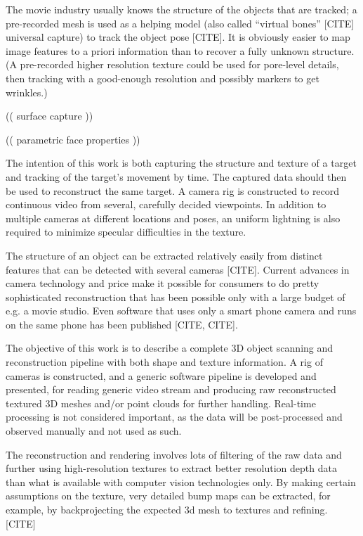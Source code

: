 The movie industry usually knows the structure of the objects that are tracked; a pre-recorded mesh is used as a helping model (also called ``virtual bones'' [CITE] universal capture) to track the object pose [CITE].
It is obviously easier to map image features to a priori information than to recover a fully unknown structure.
(A pre-recorded higher resolution texture could be used for pore-level details, then tracking with a good-enough resolution and possibly markers to get wrinkles.)

(( surface capture ))

(( parametric face properties ))

The intention of this work is both capturing the structure and texture of a target and tracking of the target's movement by time.
The captured data should then be used to reconstruct the same target.
A camera rig is constructed to record continuous video from several, carefully decided viewpoints.
In addition to multiple cameras at different locations and poses, an uniform lightning is also required to minimize specular difficulties in the texture.

The structure of an object can be extracted relatively easily from distinct features that can be detected with several cameras [CITE].
Current advances in camera technology and price make it possible for consumers to do pretty sophisticated reconstruction that has been possible only with a large budget of e.g. a movie studio.
Even software that uses only a smart phone camera and runs on the same phone has been published [CITE, CITE].

The objective of this work is to describe a complete 3D object scanning and reconstruction pipeline with both shape and texture information.
A rig of cameras is constructed, and a generic software pipeline is developed and presented, for reading generic video stream and producing raw reconstructed textured 3D meshes and/or point clouds for further handling.
Real-time processing is not considered important, as the data will be post-processed and observed manually and not used as such.

The reconstruction and rendering involves lots of filtering of the raw data and further using high-resolution textures to extract better resolution depth data than what is available with computer vision technologies only.
By making certain assumptions on the texture, very detailed bump maps can be extracted, for example, by backprojecting the expected 3d mesh to textures and refining. [CITE]

